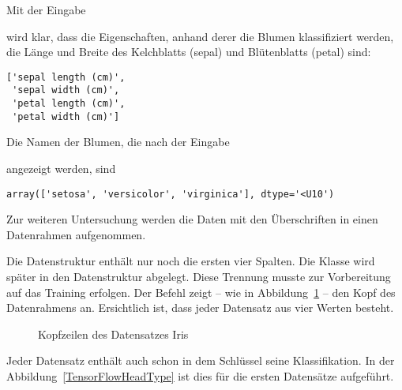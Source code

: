 Mit der Eingabe

\medskip


\medskip

wird klar, dass die Eigenschaften, anhand derer die Blumen klassifiziert werden, die Länge und Breite des Kelchblatts (sepal) und Blütenblatts (petal) sind:



\begin{lstlisting}[numbers=none]
['sepal length (cm)',
 'sepal width (cm)',
 'petal length (cm)',
 'petal width (cm)']
\end{lstlisting}

Die Namen der Blumen, die nach der Eingabe

\medskip
{}

\medskip

angezeigt werden, sind

\begin{lstlisting}[numbers=none]
array(['setosa', 'versicolor', 'virginica'], dtype='<U10')
\end{lstlisting}

Zur weiteren Untersuchung werden die Daten mit den Überschriften in einen Datenrahmen aufgenommen.

\medskip



\medskip

Die Datenstruktur  enthält nur noch die ersten vier Spalten. Die Klasse wird später in den Datenstruktur  abgelegt. Diese Trennung musste zur Vorbereitung auf das Training erfolgen. Der Befehl  zeigt -- wie in Abbildung~\ref{TensorFlowHead} -- den Kopf des Datenrahmens an. Ersichtlich ist, dass jeder Datensatz aus vier Werten besteht. 

\begin{figure}[H]
	\caption{Kopfzeilen des Datensatzes Iris}\label{TensorFlowHead}
\end{figure}

Jeder Datensatz enthält auch schon in dem Schlüssel  seine Klassifikation. In der Abbildung~\ref{TensorFlowHeadType} ist dies für die ersten Datensätze aufgeführt.

\medskip

